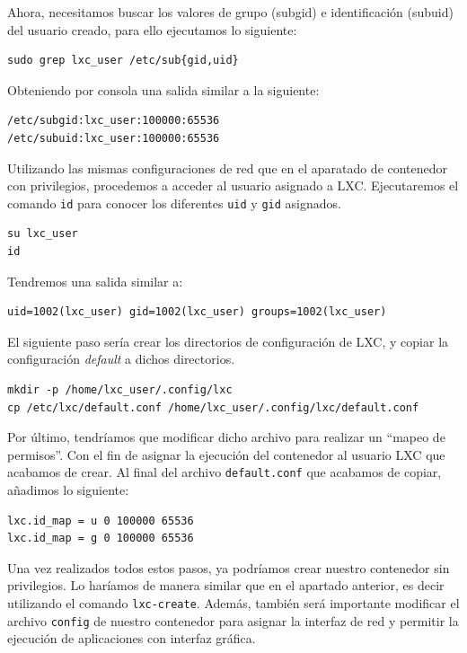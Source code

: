 \documentclass[12pt]{article}
\begin{document}
	\noindent Ahora, necesitamos buscar los valores de grupo (subgid) e identificación (subuid) del usuario creado, para ello ejecutamos lo siguiente:
	\begin{verbatim}
sudo grep lxc_user /etc/sub{gid,uid}
	\end{verbatim}

	\noindent Obteniendo por consola una salida similar a la siguiente:
	\begin{verbatim}
/etc/subgid:lxc_user:100000:65536
/etc/subuid:lxc_user:100000:65536
	\end{verbatim}

	\pagebreak
	
	\noindent Utilizando las mismas configuraciones de red que en el aparatado de contenedor con privilegios, procedemos a acceder al usuario asignado a LXC. Ejecutaremos el comando \texttt{id} para conocer los diferentes \texttt{uid} y \texttt{gid} asignados.
	\begin{verbatim}
su lxc_user
id
	\end{verbatim}

	\noindent Tendremos una salida similar a:
	\begin{verbatim}
uid=1002(lxc_user) gid=1002(lxc_user) groups=1002(lxc_user)
	\end{verbatim}

	\noindent El siguiente paso sería crear los directorios de configuración de LXC, y copiar la configuración \textit{default} a dichos directorios.
	\begin{verbatim}
mkdir -p /home/lxc_user/.config/lxc
cp /etc/lxc/default.conf /home/lxc_user/.config/lxc/default.conf
	\end{verbatim}

	\noindent Por último, tendríamos que modificar dicho archivo para realizar un ``mapeo de permisos''. Con el fin de asignar la ejecución del contenedor al usuario LXC que acabamos de crear. Al final del archivo \texttt{default.conf} que acabamos de copiar, añadimos lo siguiente:
	\begin{lstlisting}[language=Bash, caption={Configuración para mapear UID y GID para un contenedor sin privilegios en LXC}]
lxc.id_map = u 0 100000 65536
lxc.id_map = g 0 100000 65536
	\end{lstlisting}

	\noindent Una vez realizados todos estos pasos, ya podríamos crear nuestro contenedor sin privilegios. Lo haríamos de manera similar que en el apartado anterior, es decir utilizando el comando \texttt{lxc-create}. Además, también será importante modificar el archivo \texttt{config} de nuestro contenedor para asignar la interfaz de red y permitir la ejecución de aplicaciones con interfaz gráfica. \\
	
\end{document}
